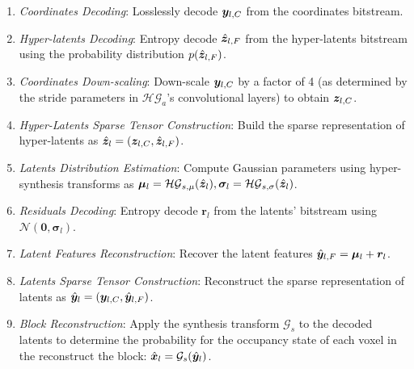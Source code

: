 \begin{enumerate}[label=D\arabic*.]
    \item \textit{Coordinates Decoding}: Losslessly decode $\y_{l, C}$ from the coordinates bitstream.
    \item \textit{Hyper-latents Decoding}: Entropy decode $\hat{\z}_{l, F}$ from the hyper-latents bitstream using the probability distribution $p(\hat{\z}_{l, F})$.
    \item \textit{Coordinates Down-scaling}: Down-scale $\y_{l, C}$ by a factor of 4 (as determined by the stride parameters in $\mathcal{HG}_a$'s convolutional layers) to obtain $\z_{l, C}$.
    \item \textit{Hyper-Latents Sparse Tensor Construction}:  Build the sparse representation of hyper-latents as $\hat{\z}_l = (\z_{l, C}, \hat{\z}_{l, F})$.
    \item \textit{Latents Distribution Estimation}:  Compute Gaussian parameters using hyper-synthesis transforms as $\boldsymbol{\mu}_l = \mathcal{HG}_{s, \mu}(\hat{\z}_l), \boldsymbol{\sigma }_l= \mathcal{HG}_{s, \sigma}(\hat{\z}_l)$.
    \item \textit{Residuals Decoding}: Entropy decode $\boldsymbol{r}_l$ from the latents' bitstream using $\mathcal{N}(\boldsymbol{0}, \boldsymbol{\sigma}_l)$.
    \item \textit{Latent Features Reconstruction}: Recover the latent features $\hat{\y}_{l, F} = \boldsymbol{\mu}_l + \boldsymbol{r}_l$.
    \item \textit{Latents Sparse Tensor Construction}: Reconstruct the sparse representation of latents as $\hat{\y}_l = (\y_{l, C}, \hat{\y}_{l, F})$.
    \item \textit{Block Reconstruction}: Apply the synthesis transform $\mathcal{G}_s$ to the decoded latents to determine the probability for the occupancy state of each voxel in the reconstruct the block: $\hat{\x}_l = \mathcal{G}_s(\hat{\y}_l)$. 
\end{enumerate}

